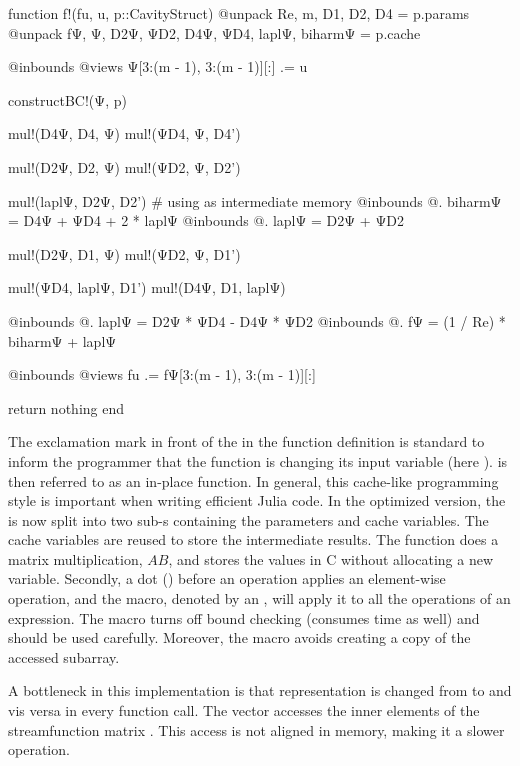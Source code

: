 \begin{jllisting}[caption=Optimized implementation in Julia of the nonlinear
  function $F$ \vspace{3pt}]
function f!(fu, u, p::CavityStruct)
    @unpack Re, m, D1, D2, D4 = p.params
    @unpack fΨ, Ψ, D2Ψ, ΨD2, D4Ψ, ΨD4, laplΨ, biharmΨ = p.cache

    @inbounds @views Ψ[3:(m - 1), 3:(m - 1)][:] .= u

    constructBC!(Ψ, p)

    mul!(D4Ψ, D4, Ψ)
    mul!(ΨD4, Ψ, D4')

    mul!(D2Ψ, D2, Ψ)
    mul!(ΨD2, Ψ, D2')

    mul!(laplΨ, D2Ψ, D2') # using as intermediate memory
    @inbounds @. biharmΨ = D4Ψ + ΨD4 + 2 * laplΨ
    @inbounds @. laplΨ = D2Ψ + ΨD2

    mul!(D2Ψ, D1, Ψ)
    mul!(ΨD2, Ψ, D1')

    mul!(ΨD4, laplΨ, D1')
    mul!(D4Ψ, D1, laplΨ)

    @inbounds @. laplΨ = D2Ψ * ΨD4 - D4Ψ * ΨD2
    @inbounds @. fΨ = (1 / Re) * biharmΨ + laplΨ

    @inbounds @views fu .= fΨ[3:(m - 1), 3:(m - 1)][:]

    return nothing
end
\end{jllisting}

The exclamation mark in front of the  in the function definition is
standard to inform the programmer that the function is changing its input
variable (here ).  is then referred to as an
in-place function. In general, this cache-like programming style is important
when writing efficient Julia code. In the optimized version, the  is now split into two sub-s containing the parameters and
cache variables. The cache variables are reused to store the intermediate
results. The  function does a matrix multiplication, $AB$,
and stores the values in C without allocating a new variable. Secondly, a dot
() before an operation applies an element-wise operation, and the
macro, denoted by an , will apply it to all the operations of an
expression. The  macro turns off bound checking (consumes time
as well) and should be used carefully. Moreover, the macro 
avoids creating a copy of the accessed subarray.

A bottleneck in this implementation is that representation is changed from
 to  and vis versa in every function call. The vector
 accesses the inner elements of the streamfunction matrix .
This access is not aligned in memory, making it a slower operation. \\

